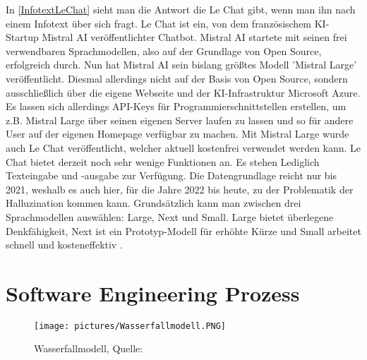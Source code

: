 In \autoref{InfotextLeChat} sieht man die Antwort die Le Chat gibt, wenn man ihn nach einem Infotext über sich 
fragt. Le Chat ist ein, von dem französischem KI-Startup Mistral AI veröffentlichter Chatbot. Mistral AI startete mit  
seinen frei verwendbaren Sprachmodellen, also auf der Grundlage von Open Source, erfolgreich durch. Nun  
hat Mistral AI sein bislang größtes Modell 'Mistral Large' veröffentlicht. Diesmal allerdings nicht auf der  
Basis von Open Source, sondern ausschließlich über die eigene Webseite und der KI-Infrastruktur Microsoft  
Azure. Es lassen sich allerdings API-Keys für Programmierschnittstellen erstellen, um z.B. Mistral Large über  
seinen eigenen Server laufen zu lassen und so für andere User auf der eigenen Homepage verfügbar zu machen.  
Mit Mistral Large wurde auch Le Chat veröffentlicht, welcher aktuell kostenfrei verwendet werden kann.
Le Chat bietet derzeit noch sehr wenige Funktionen an. Es stehen Lediglich Texteingabe und -ausgabe zur Verfügung.  
Die Datengrundlage reicht nur bis 2021, weshalb es auch hier, für die Jahre 2022 bis heute, zu der Problematik der  
Halluzination kommen kann.
Grundsätzlich kann man zwischen drei Sprachmodellen auswählen: Large, Next und Small. Large bietet überlegene Denkfähigkeit,  
Next ist ein Prototyp-Modell für erhöhte Kürze und Small arbeitet schnell und kosteneffektiv \cite{GrundlagenLeChat}.


\section{Software Engineering Prozess}

\begin{figure}
    \centering
    \texttt{[image: pictures/Wasserfallmodell.PNG]}
    \caption{Wasserfallmodell, Quelle: \cite{Sommerville10}}
    \label{Ablauf Wasserfallmodell}
\end{figure}

